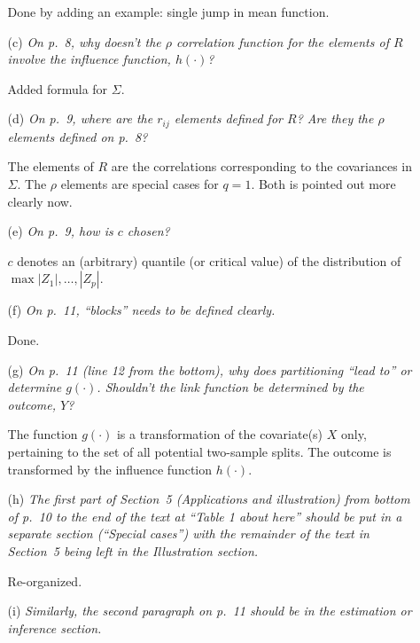 \documentclass[11pt,a4paper]{article}
\begin{document}
\begin{enumerate}
\begin{itemize}
	       Done by adding an example: single jump in mean function.
	       
    \item[(c)] \textit{On p.~8, why doesn't the $\rho$ correlation function for the
               elements of $R$ involve the influence function, $h(\cdot)$?}
	       
	       Added formula for $\Sigma$.
	       
    \item[(d)] \textit{On p.~9, where are the $r_{ij}$ elements defined for $R$? Are
               they the $\rho$ elements defined on p.~8?}
    
               The elements of $R$ are the correlations corresponding to the covariances
	       in $\Sigma$. The $\rho$ elements are special cases for $q = 1$.
	       Both is pointed out more clearly now.

    \item[(e)] \textit{On p.~9, how is $c$ chosen?}
    
               $c$ denotes an (arbitrary) quantile (or critical value) of the distribution
	       of $\max  |Z_1|, \dots, |Z_p|$.
	       
    \item[(f)] \textit{On p.~11, ``blocks'' needs to be defined clearly.}
               
	       Done.
	       
    \item[(g)] \textit{On p.~11 (line 12 from the bottom), why does partitioning 
               ``lead to'' or determine $g(\cdot)$. Shouldn't the link function be
	       determined by the outcome, $Y$?}
	       
	       The function $g(\cdot)$ is a transformation of the covariate(s) $X$
	       only, pertaining to the set of all potential two-sample splits.
	       The outcome is transformed by the influence function $h(\cdot)$.
	       
    \item[(h)] \textit{The first part of Section~5 (Applications and illustration)
              from bottom of p.~10 to the end of the text at ``Table 1 about here''
	       should be put in a separate section (``Special cases'') with the
	       remainder of the text in Section~5 being left in the Illustration
	       section.}
	       
	       Re-organized.
	       
    \item[(i)] \textit{Similarly, the second paragraph on p.~11 should be in the
               estimation or inference section.}
	       

\end{itemize}
\end{enumerate}
\end{document}
